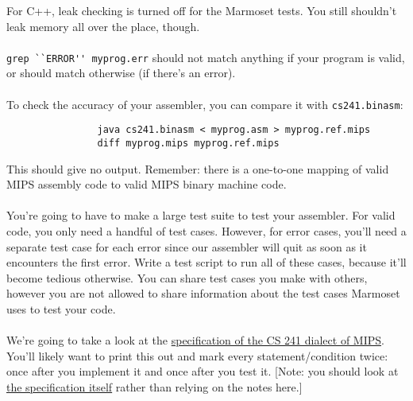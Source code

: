 \documentclass[]{article}
\theoremstyle{definition}
\begin{document}
			For C++, leak checking is turned off for the Marmoset tests. You still shouldn't leak memory all over the place, though.
			\\ \\
			\verb+grep ``ERROR'' myprog.err+ should not match anything if your program is valid, or should match otherwise (if there's an error).
			\\ \\
			To check the accuracy of your assembler, you can compare it with \verb+cs241.binasm+:
			\begin{verbatim}
				java cs241.binasm < myprog.asm > myprog.ref.mips
				diff myprog.mips myprog.ref.mips
			\end{verbatim}
			This should give no output. Remember: there is a one-to-one mapping of valid MIPS assembly code to valid MIPS binary machine code.
			\\ \\
			You're going to have to make a large test suite to test your assembler. For valid code, you only need a handful of test cases. However, for error cases, you'll need a separate test case for each error since our assembler will quit as soon as it encounters the first error. Write a test script to run all of these cases, because it'll become tedious otherwise. You can share test cases you make with others, however you are not allowed to share information about the test cases Marmoset uses to test your code.
			\\ \\
			We're going to take a look at the \href{https://www.student.cs.uwaterloo.ca/~cs241/mips/mipsasm.html}{specification of the CS 241 dialect of MIPS}. You'll likely want to print this out and mark every statement/condition twice: once after you implement it and once after you test it. [Note: you should look at \href{https://www.student.cs.uwaterloo.ca/~cs241/mips/mipsasm.html}{the specification itself} rather than relying on the notes here.]
			
\end{document}
